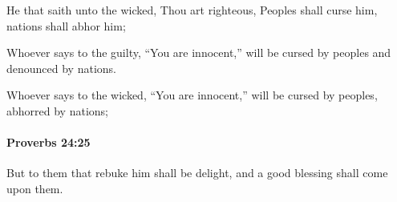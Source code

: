 			\begin{versebox}
					\item[BHS] 
					\item[ASV] He that saith unto the wicked, Thou art righteous, Peoples shall curse him, nations shall abhor him;
					\item[NIV] Whoever says to the guilty, “You are innocent,” will be cursed by peoples and denounced by nations.
					\item[NRSV] Whoever says to the wicked, “You are innocent,” will be cursed by peoples, abhorred by nations;
			\end{versebox}

		\paragraph{Proverbs 24:25} %
			\label{PROVERBS-24-25}

			But to them that rebuke him shall be delight, and a good blessing shall come upon them.

